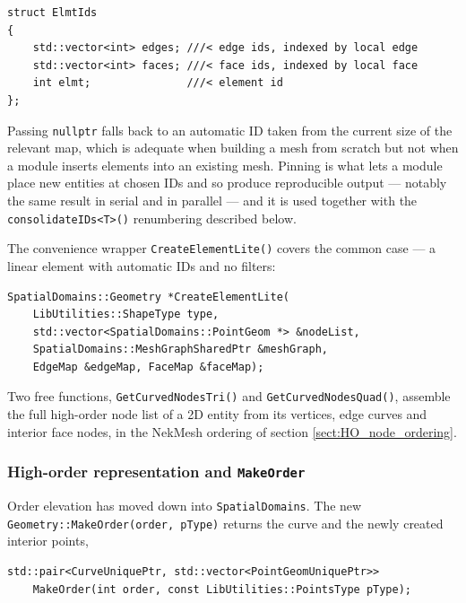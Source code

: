 \begin{itemize}
\begin{lstlisting}[style=BashInputStyle]
struct ElmtIds
{
    std::vector<int> edges; ///< edge ids, indexed by local edge
    std::vector<int> faces; ///< face ids, indexed by local face
    int elmt;               ///< element id
};
\end{lstlisting}
    Passing \texttt{nullptr} falls back to an automatic ID taken from
    the current size of the relevant map, which is adequate when
    building a mesh from scratch but not when a module inserts
    elements into an existing mesh. Pinning is what lets a module
    place new entities at chosen IDs and so produce reproducible
    output --- notably the same result in serial and in parallel ---
    and it is used together with the \texttt{consolidateIDs<T>()}
    renumbering described below.
\end{itemize}

\noindent The convenience wrapper \texttt{CreateElementLite()} covers
the common case --- a linear element with automatic IDs and no
filters:

\begin{lstlisting}[style=BashInputStyle]
SpatialDomains::Geometry *CreateElementLite(
    LibUtilities::ShapeType type,
    std::vector<SpatialDomains::PointGeom *> &nodeList,
    SpatialDomains::MeshGraphSharedPtr &meshGraph,
    EdgeMap &edgeMap, FaceMap &faceMap);
\end{lstlisting}

Two free functions, \texttt{GetCurvedNodesTri()} and
\texttt{GetCurvedNodesQuad()}, assemble the full high-order node list
of a 2D entity from its vertices, edge curves and interior face nodes,
in the NekMesh ordering of section \ref{sect:HO_node_ordering}.

\subsubsection{High-order representation and \texttt{MakeOrder}}
Order elevation has moved down into \texttt{SpatialDomains}. The new
\texttt{Geometry::MakeOrder(order, pType)} returns the curve and the
newly created interior points,

\begin{lstlisting}[style=BashInputStyle]
std::pair<CurveUniquePtr, std::vector<PointGeomUniquePtr>>
    MakeOrder(int order, const LibUtilities::PointsType pType);
\end{lstlisting}

